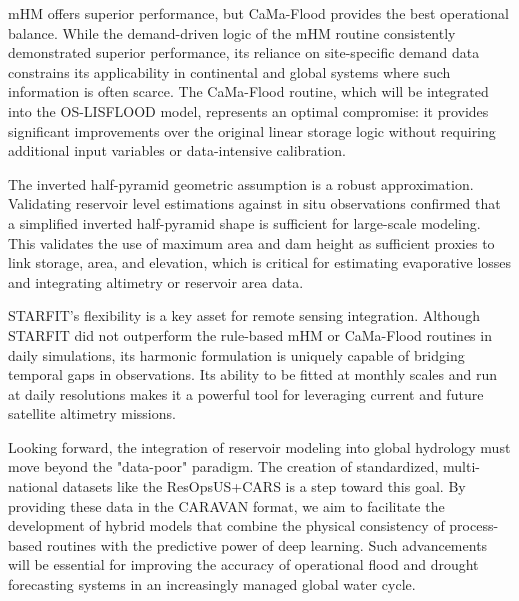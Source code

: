 \documentclass[hess, manuscript]{copernicus}
\begin{document}
mHM offers superior performance, but CaMa-Flood provides the best operational balance. While the demand-driven logic of the mHM routine consistently demonstrated superior performance, its reliance on site-specific demand data constrains its applicability in continental and global systems where such information is often scarce. The CaMa-Flood routine, which will be integrated into the OS-LISFLOOD model, represents an optimal compromise: it provides significant improvements over the original linear storage logic without requiring additional input variables or data-intensive calibration.

The inverted half-pyramid geometric assumption is a robust approximation. Validating reservoir level estimations against in situ observations confirmed that a simplified inverted half-pyramid shape is sufficient for large-scale modeling. This validates the use of maximum area and dam height as sufficient proxies to link storage, area, and elevation, which is critical for estimating evaporative losses and integrating altimetry or reservoir area data.

STARFIT’s flexibility is a key asset for remote sensing integration. Although STARFIT did not outperform the rule-based mHM or CaMa-Flood routines in daily simulations, its harmonic formulation is uniquely capable of bridging temporal gaps in observations. Its ability to be fitted at monthly scales and run at daily resolutions makes it a powerful tool for leveraging current and future satellite altimetry missions.

Looking forward, the integration of reservoir modeling into global hydrology must move beyond the "data-poor" paradigm. The creation of standardized, multi-national datasets like the ResOpsUS+CARS is a step toward this goal. By providing these data in the CARAVAN format, we aim to facilitate the development of hybrid models that combine the physical consistency of process-based routines with the predictive power of deep learning. Such advancements will be essential for improving the accuracy of operational flood and drought forecasting systems in an increasingly managed global water cycle.


\end{document}
